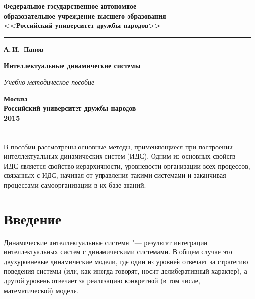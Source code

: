 \documentclass[b5paper,11pt]{book}
\begin{document}
	\begin{titlepage}
		\begin{center}
			{\bfseries  Федеральное государственное автономное \\
				образовательное учреждение высшего образования\\
				<<Российский университет дружбы народов>>
				
			}

			\vspace{-5pt}
			\noindent\rule{\textwidth}{2pt}
			
			\vspace{50pt}
			{\Large\bfseries А.\,И.~Панов}
			
			\vspace{100pt}
			{\Huge\bfseries Интеллектуальные динамические системы}
			
			\vspace{20pt}
			{\Large\itshape Учебно-методическое пособие}
			
			\vfill
			{\bfseries Москва\\
				Российский университет дружбы народов\\
				2015
			}
		\end{center}
	\end{titlepage}
	
	\chapter*{}
	
	В пособии рассмотрены основные методы, применяющиеся при построении интеллектуальных динамических систем (ИДС). Одним из основных свойств ИДС является свойство иерархичности, уровневости организации всех процессов, связанных с ИДС, начиная от управления такими системами и заканчивая процессами самоорганизации в их базе знаний.
	
	
	\tableofcontents %
		
	\chapter*{Введение}
	Динамические интеллектуальные системы "--- результат интеграции интеллектуальных систем с динамическими системами. В общем случае это двухуровневые динамические модели, где один из уровней отвечает за стратегию поведения системы (или, как иногда говорят, носит делиберативный характер), а другой уровень отвечает за реализацию конкретной (в том числе, математической) модели.
	
\end{document}

